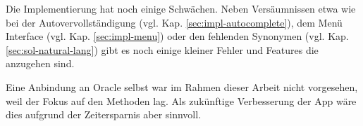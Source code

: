 \documentclass[oneside,bibliography=totocnumbered,BCOR=5mm]{scrbook}
\begin{document}
Die Implementierung hat noch einige Schwächen. Neben Versäumnissen etwa wie bei
der Autovervollständigung (vgl. Kap. \ref{sec:impl-autocomplete}), dem Menü
Interface (vgl. Kap. \ref{sec:impl-menu}) oder den fehlenden Synonymen (vgl.
Kap. \ref{sec:sol-natural-lang}) gibt es noch einige kleiner Fehler und Features
die anzugehen sind.

\medskip

Eine Anbindung an Oracle selbst war im Rahmen dieser Arbeit nicht vorgesehen,
weil der Fokus auf den Methoden lag. Als zukünftige Verbesserung der App wäre
dies aufgrund der Zeitersparnis aber sinnvoll.

\end{document}
